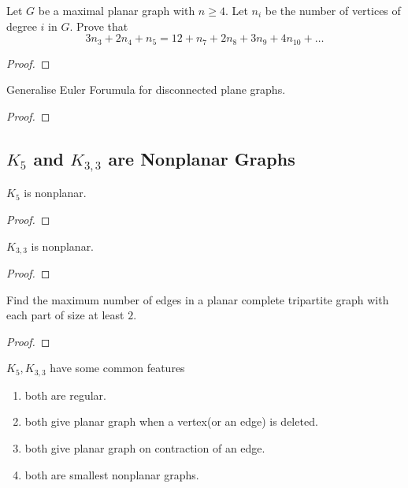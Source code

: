 \begin{exercise}
	Let $G$ be a maximal planar graph with $n \ge 4$. Let $n_i$ be the number of vertices of degree $i$ in $G$. Prove that $$ 3n_3 + 2n_4 + n_5 = 12 + n_7 + 2n_8 + 3n_9 + 4n_{10} + \dots $$
\end{exercise}
\begin{proof}
\end{proof}

\begin{exercise}
	Generalise Euler Forumula for disconnected plane graphs.
\end{exercise}
\begin{proof}
\end{proof}

\subsection{$K_5$ and $K_{3,3}$ are Nonplanar Graphs}
\begin{theorem}
	$K_5$ is nonplanar.
\end{theorem}
\begin{proof}
\end{proof}

\begin{theorem}
	$K_{3,3}$ is nonplanar.
\end{theorem}
\begin{proof}
\end{proof}

\begin{exercise}
	Find the maximum number of edges in a planar complete tripartite graph with each part of size at least $2$.
\end{exercise}
\begin{proof}
\end{proof}

\begin{remark} $K_5, K_{3,3}$ have some common features
\begin{enumerate}
	\item both are regular.
	\item both give planar graph when a vertex(or an edge) is deleted.
	\item both give planar graph on contraction of an edge.
	\item both are smallest nonplanar graphs.
\end{enumerate}
\end{remark}

